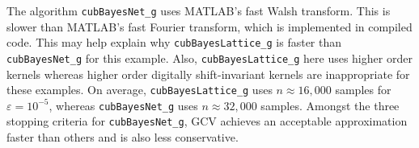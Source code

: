 \documentclass[graybox,footinfo]{svmult}
\newcommand{\FJHNote}[1]{{\textcolor{blue}{FJH: #1}}}
\newcommand{\JRNote}[1]{{\textcolor{green}{JR: #1}}}
\begin{document}
The algorithm \texttt{cubBayesNet\_g} uses MATLAB's fast Walsh transform.  This is slower than MATLAB's fast Fourier transform, which is implemented in compiled code. This may help explain why \texttt{cubBayesLattice\_g} is faster than \texttt{cubBayesNet\_g} for this example. Also, \texttt{cubBayesLattice\_g} here uses higher order kernels whereas higher order digitally shift-invariant kernels are inappropriate for these examples. On average, \texttt{cubBayesLattice\_g} uses $n \approx 16{,}000$ samples for $\varepsilon = 10^{-5}$, whereas \texttt{cubBayesNet\_g} uses  $n \approx 32{,}000$ samples.
Amongst the three stopping criteria for \texttt{cubBayesNet\_g}, GCV achieves an acceptable approximation faster than others and is also less conservative. 
\end{document}
